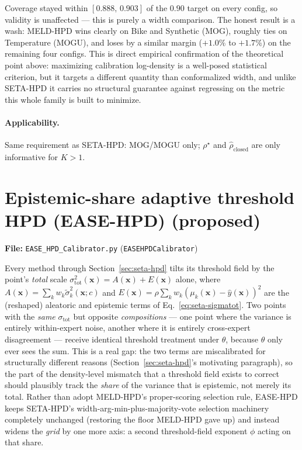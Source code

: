 \documentclass[11pt]{article}
\begin{document}
Coverage stayed within $[0.888,\,0.903]$ of the $0.90$ target on every config, so validity is
unaffected --- this is purely a width comparison. The honest result is a wash: MELD-HPD wins
clearly on Bike and Synthetic (MOG), roughly ties on Temperature (MOGU), and loses by a similar
margin ($+1.0\%$ to $+1.7\%$) on the remaining four configs. This is direct empirical confirmation
of the theoretical point above: maximizing calibration log-density is a well-posed statistical
criterion, but it targets a different quantity than conformalized width, and unlike SETA-HPD it
carries no structural guarantee against regressing on the metric this whole family is built to
minimize.

\paragraph{Applicability.} Same requirement as SETA-HPD: MOG/MOGU only; $\rho^\star$ and
$\hat\rho_{\mathrm{closed}}$ are only informative for $K>1$.

\section{Epistemic-share adaptive threshold HPD (EASE-HPD) (proposed)}
\label{sec:ease-hpd}
\textbf{File:} \texttt{EASE\_HPD\_Calibrator.py} (\texttt{EASEHPDCalibrator})

Every method through Section~\ref{sec:seta-hpd} tilts its threshold field by the point's
\emph{total} scale $\sigma_{\mathrm{tot}}^2(\bm x)=A(\bm x)+E(\bm x)$ alone, where
$A(\bm x)=\sum_k w_k\tilde\sigma_k^2(\bm x;c)$ and $E(\bm x)=\rho\sum_k w_k(\mu_k(\bm x)-\hat y(\bm
x))^2$ are the (reshaped) aleatoric and epistemic terms of Eq.~\eqref{eq:seta-sigmatot}. Two
points with the \emph{same} $\sigma_{\mathrm{tot}}$ but opposite \emph{compositions} --- one point
where the variance is entirely within-expert noise, another where it is entirely cross-expert
disagreement --- receive identical threshold treatment under $\theta$, because $\theta$ only ever
sees the sum. This is a real gap: the two terms are miscalibrated for structurally different
reasons (Section~\ref{sec:seta-hpd}'s motivating paragraph), so the part of the density-level
mismatch that a threshold field exists to correct should plausibly track the \emph{share} of the
variance that is epistemic, not merely its total. Rather than adopt MELD-HPD's proper-scoring
selection rule, EASE-HPD keeps SETA-HPD's width-arg-min-plus-majority-vote selection machinery
completely unchanged (restoring the floor MELD-HPD gave up) and instead widens the \emph{grid} by
one more axis: a second threshold-field exponent $\phi$ acting on that share.
\end{document}
